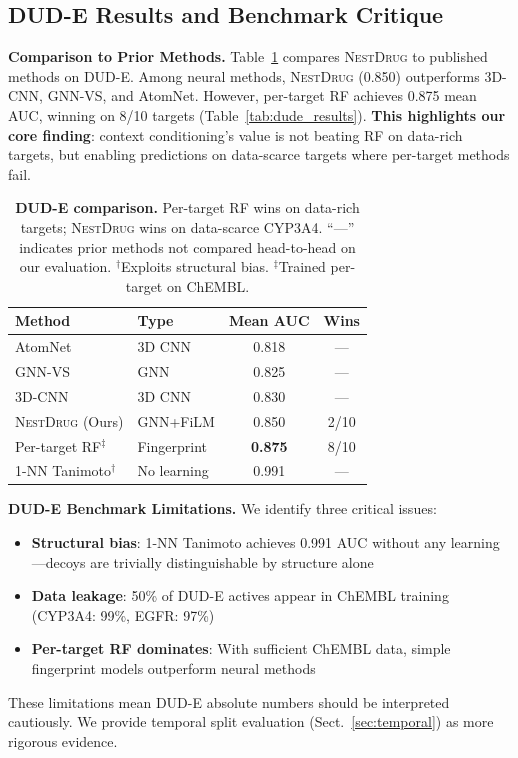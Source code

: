 \documentclass[runningheads]{llncs}
\newcommand{\methodname}{\textsc{NestDrug}}
\begin{document}
\subsection{DUD-E Results and Benchmark Critique}

\textbf{Comparison to Prior Methods.} Table~\ref{tab:sota} compares \methodname{} to published methods on DUD-E. Among neural methods, \methodname{} (0.850) outperforms 3D-CNN, GNN-VS, and AtomNet. However, per-target RF achieves 0.875 mean AUC, winning on 8/10 targets (Table~\ref{tab:dude_results}). \textbf{This highlights our core finding}: context conditioning's value is not beating RF on data-rich targets, but enabling predictions on data-scarce targets where per-target methods fail.

\begin{table}[t]
\caption{\textbf{DUD-E comparison.} Per-target RF wins on data-rich targets; \methodname{} wins on data-scarce CYP3A4. ``---'' indicates prior methods not compared head-to-head on our evaluation. $^\dagger$Exploits structural bias. $^\ddagger$Trained per-target on ChEMBL.}
\label{tab:sota}
\centering
\small
\begin{tabular}{@{}llcc@{}}
\toprule
\textbf{Method} & \textbf{Type} & \textbf{Mean AUC} & \textbf{Wins} \\
\midrule
AtomNet \cite{wallach_2015_atomnet} & 3D CNN & 0.818 & --- \\
GNN-VS \cite{lim_2019_gnn_vs} & GNN & 0.825 & --- \\
3D-CNN \cite{ragoza_2017_3dcnn} & 3D CNN & 0.830 & --- \\
\methodname{} (Ours) & GNN+FiLM & 0.850 & 2/10 \\
Per-target RF$^\ddagger$ & Fingerprint & \textbf{0.875} & 8/10 \\
\midrule
1-NN Tanimoto$^\dagger$ & No learning & 0.991 & --- \\
\bottomrule
\end{tabular}
\end{table}

\textbf{DUD-E Benchmark Limitations.} We identify three critical issues:
\begin{itemize}[noitemsep,topsep=0pt]
\item \textbf{Structural bias}: 1-NN Tanimoto achieves 0.991 AUC without any learning---decoys are trivially distinguishable by structure alone \cite{wallach_2018_dude_bias}
\item \textbf{Data leakage}: 50\% of DUD-E actives appear in ChEMBL training (CYP3A4: 99\%, EGFR: 97\%)
\item \textbf{Per-target RF dominates}: With sufficient ChEMBL data, simple fingerprint models outperform neural methods
\end{itemize}
These limitations mean DUD-E absolute numbers should be interpreted cautiously. We provide temporal split evaluation (Sect.~\ref{sec:temporal}) as more rigorous evidence.
\end{document}
